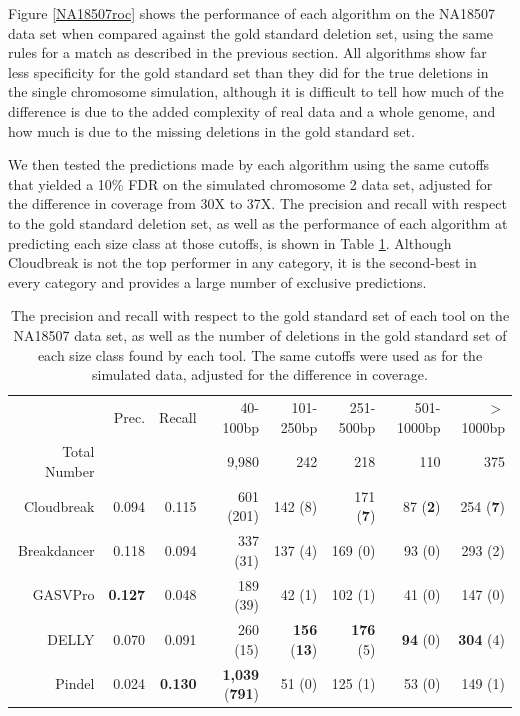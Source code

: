 \documentclass[11pt]{article}
\begin{document}
Figure \ref{NA18507roc} shows the performance of each algorithm on the NA18507 data set when compared against the gold standard deletion set, using the same rules for a match as described in the previous section. All algorithms show far less specificity for the gold standard set than they did for the true deletions in the single chromosome simulation, although it is difficult to tell how much of the difference is due to the added complexity of real data and a whole genome, and how much is due to the missing deletions in the gold standard set. 

We then tested the predictions made by each algorithm using the same cutoffs that yielded a 10\% FDR on the simulated chromosome 2 data set, adjusted for the difference in coverage from 30X to 37X. The precision and recall with respect to the gold standard deletion set, as well as the performance of each algorithm at predicting each size class at those cutoffs, is shown in Table \ref{NA18507preds}. Although Cloudbreak is not the top performer in any category, it is the second-best in every category and provides a large number of exclusive predictions.

\begin{table}[t]
\begin{center}
\begin{tabular}{rrr|rrrrr}
  \hline
 & Prec. & Recall & 40-100bp & 101-250bp & 251-500bp & 501-1000bp & $>$ 1000bp \\ 
Total Number & & & 9,980 & 242 & 218 & 110 & 375 \\
  \hline
Cloudbreak & 0.094 & 0.115 & 601 (201) & 142 (8) & 171 (\textbf{7}) &  87 (\textbf{2}) & 254 (\textbf{7}) \\ 
Breakdancer & 0.118 & 0.094 & 337 (31) & 137 (4) & 169 (0) & 93 (0) & 293 (2) \\
  GASVPro & \textbf{0.127} & 0.048 & 189 (39) &  42 (1) & 102 (1) &  41 (0) & 147 (0) \\ 
  DELLY & 0.070 & 0.091 & 260 (15) & \textbf{156} (\textbf{13}) & \textbf{176} (5) &  \textbf{94} (0) & \textbf{304} (4) \\ 
  Pindel & 0.024 & \textbf{0.130} & \textbf{1,039} (\textbf{791}) & 51 (0) & 125 (1) &  53 (0) & 149 (1) \\ 
   \hline
\end{tabular}
\end{center}
\caption{The precision and recall with respect to the gold standard set of each tool on the NA18507 data set, as well as the number of deletions in the gold standard set of each size class found by each tool. The same cutoffs were used as for the simulated data, adjusted for the difference in coverage.}
\label{NA18507preds}
\end{table}
\end{document}
